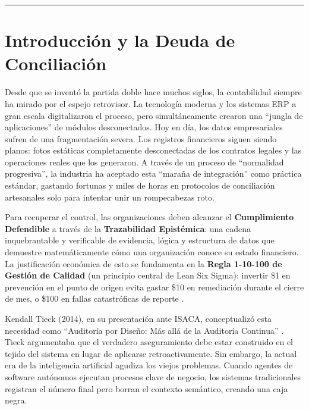 \documentclass[12pt, a4paper]{article}
\begin{document}
\hrule
\vspace{1em}

\section{Introducción y la Deuda de Conciliación}

Desde que se inventó la partida doble hace muchos siglos, la contabilidad siempre ha mirado por el espejo retrovisor. La tecnología moderna y los sistemas ERP a gran escala digitalizaron el proceso, pero simultáneamente crearon una ``jungla de aplicaciones'' de módulos desconectados. Hoy en día, los datos empresariales sufren de una fragmentación severa. Los registros financieros siguen siendo planos: fotos estáticas completamente desconectadas de los contratos legales y las operaciones reales que los generaron. A través de un proceso de ``normalidad progresiva'', la industria ha aceptado esta ``maraña de integración'' como práctica estándar, gastando fortunas y miles de horas en protocolos de conciliación artesanales solo para intentar unir un rompecabezas roto.

Para recuperar el control, las organizaciones deben alcanzar el \textbf{Cumplimiento Defendible} a través de la \textbf{Trazabilidad Epistémica}: una cadena inquebrantable y verificable de evidencia, lógica y estructura de datos que demuestre matemáticamente cómo una organización conoce su estado financiero. La justificación económica de esto se fundamenta en la \textbf{Regla 1-10-100 de Gestión de Calidad} (un principio central de Lean Six Sigma): invertir \$1 en prevención en el punto de origen evita gastar \$10 en remediación durante el cierre de mes, o \$100 en fallas catastróficas de reporte \cite{defeo2017}.

Kendall Tieck (2014), en su presentación ante ISACA, conceptualizó esta necesidad como ``Auditoría por Diseño: Más allá de la Auditoría Continua'' \cite{tieck2014}. Tieck argumentaba que el verdadero aseguramiento debe estar construido en el tejido del sistema en lugar de aplicarse retroactivamente. Sin embargo, la actual era de la inteligencia artificial agudiza los viejos problemas. Cuando agentes de software autónomos ejecutan procesos clave de negocio, los sistemas tradicionales registran el número final pero borran el contexto semántico, creando una caja negra.
\end{document}
